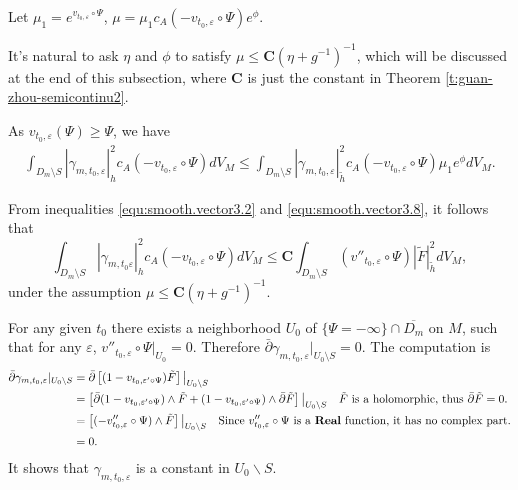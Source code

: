 Let $\mu_{1}=e^{v_{t_0,\varepsilon}\circ\Psi}$,
$\mu=\mu_{1}c_{A}(-v_{t_0,\varepsilon}\circ\Psi)e^{\phi}$.

It's natural to ask $\eta$ and $\phi$ to satisfy $\mu\leq
\mathbf{C}(\eta+g^{-1})^{-1}$, which will be discussed at the end of
this subsection, where $\mathbf{C}$ is just the constant in Theorem
\ref{t:guan-zhou-semicontinu2}.

As $v_{t_0,\varepsilon}(\Psi)\geq\Psi$, we have
\begin{equation}
\label{equ:smooth.vector3.8}
\begin{split}
\int_{ D_m\setminus S}|\gamma_{m,t_0,\varepsilon}|^{2}_{h}c_{A}(-v_{t_0,\varepsilon}\circ\Psi)dV_{M}
\leq\int_{ D_m\setminus S}
|\gamma_{m,t_0,\varepsilon}|^{2}_{\tilde{h}}c_{A}(-v_{t_0,\varepsilon}\circ\Psi)\mu_{1}e^{\phi} dV_{M}.
\end{split}
\end{equation}

From inequalities \ref{equ:smooth.vector3.2} and
\ref{equ:smooth.vector3.8}, it follows that
$$\int_{D_m\setminus S}|\gamma_{m,t_0\varepsilon}|^{2}_{h}c_{A}(-v_{t_0,\varepsilon}\circ\Psi)dV_{M}
\leq\mathbf{C}\int_{D_m\setminus S}
(v''_{t_0,\varepsilon}\circ{\Psi})| \tilde{F}|^2_{\tilde{h}}dV_M,$$
under the assumption $\mu\leq\mathbf{C} (\eta+g^{-1})^{-1}$.

For any given $t_{0}$ there exists a neighborhood $U_{0}$ of
$\{\Psi=-\infty\}\cap \overline{D_{m}}$ on $M$, such that for any
$\varepsilon$, $v''_{t_0,\varepsilon}\circ\Psi|_{U_{0}}=0$.
Therefore $\bar\partial\gamma_{m,t_0,\varepsilon}|_{U_0\setminus
S}=0$. The computation is
\[
\begin{aligned}
\bar\partial\gamma_{m,t_0,\varepsilon}|_{U_0\setminus
S} &=\bar\partial\left[(1-v_{t_0,\varepsilon'\circ \Psi})\tilde{F}\right]\big|_{U_0\backslash S}\\ 
&=\left[\bar\partial(1-v_{t_0,\varepsilon'\circ \Psi})\wedge\tilde{F}+(1-v_{t_0,\varepsilon'\circ \Psi})\wedge\bar\partial\tilde{F}\right]\big|_{U_0\backslash S} \quad\text{$\tilde{F}$ is a holomorphic, thus $\bar\partial\tilde{F}=0$.}\\ 
&=\left[(-v_{t_0,\varepsilon}''\circ \Psi)\wedge \tilde{F}\right]\big|_{U_0\backslash S}\quad \text{Since $v_{t_0,\varepsilon}''\circ \Psi$ is a \textbf{Real} function, it has no complex part.}\\ 
&=0.
\end{aligned}
\]
It shows that $\gamma_{m,t_0,\varepsilon}$ is a constant in $U_0\backslash S$.

